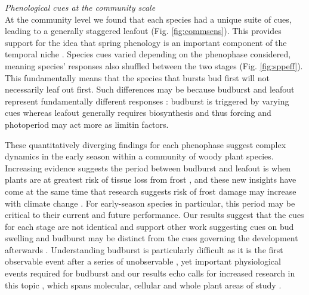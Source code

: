 \documentclass[11pt]{article}
\begin{document}

\noindent \emph{Phenological cues at the community scale}\\
\noindent At the community level we found that each species had a unique suite of cues, leading to a generally staggered leafout (Fig. \ref{fig:commsens}). This provides support for the idea that spring phenology is an important component of the temporal niche \citep{gotelli1996,Loreau:2008xy}. Species cues varied depending on the phenophase considered, meaning species' responses also shuffled between the two stages (Fig. \ref{fig:sppeff}). This fundamentally means that the species that bursts bud first will not necessarily leaf out first. Such differences may be because budburst and leafout represent fundamentally different responses \citep{Basler:2014aa}: budburst is triggered by varying cues whereas leafout generally requires biosynthesis and thus forcing and photoperiod may act more as limitin factors. 

These quantitatively diverging findings for each phenophase suggest complex dynamics in the early season within a community of woody plant species. Increasing evidence suggests the period between budburst and leafout is when plants are at greatest risk of tissue loss from frost \citep{Lenz:2013aa}, and these new insights have come at the same time that research suggests risk of frost damage may increase with climate change \citep{Augspurger:2009gj,Dai2013}. For early-season species in particular, this period may be critical to their current and future performance. Our results suggest that the cues for each stage are not identical and support other work suggesting cues on bud swelling and budburst may be distinct from the cues governing the development afterwards \citep{Basler:2014aa}. Understanding budburst is particularly difficult as it is the first observable event after a series of unobservable \citep[but see][]{rinne2011}, yet important physiological events required for budburst \citep{Caffarra:2011aa,vitasse2014rev} and our results echo calls for increased research in this topic \citep{chuine2016}, which spans molecular, cellular and whole plant areas of study \citep{Morin:2009,rinne2011,singh2017}. 
\end{document}
